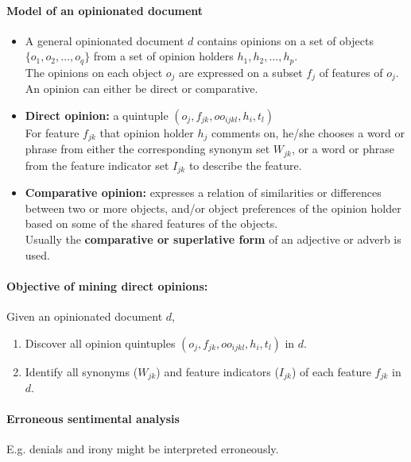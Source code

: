 \documentclass[a4paper, landscape, 6pt, fleqn]{scrartcl}
\renewcommand{\emph}[1]{\textbf{#1}}
\begin{document}
\begin{multicols*}{4}
\paragraph{Model of an opinionated document}

\begin{itemize}
\item A general opinionated document $d$ contains opinions on a set of objects $\lbrace o_1,o_2,\ldots,o_q \rbrace$ from a set of opinion holders $h_1,h_2,\ldots,h_p$. \\
The opinions on each object $o_j$ are expressed on a subset $f_j$ of features of $o_j$. \\
An opinion can either be direct or comparative.
\item \emph{Direct opinion:} a quintuple $(o_j, f_{jk}, oo_{ijkl},h_i,t_l)$ \\
For feature $f_{jk}$ that opinion holder $h_j$ comments on, he/she chooses a word or phrase from either the corresponding synonym set $W_{jk}$, or a word or phrase from the feature indicator set $I_{jk}$ to describe the feature.
\item \emph{Comparative opinion:} expresses a relation of similarities or differences between two or more objects, and/or object preferences of the opinion holder based on some of the shared features of the objects. \\
Usually the \emph{comparative or superlative form} of an adjective or adverb is used.
\end{itemize}

\paragraph{Objective of mining direct opinions:}

Given an opinionated document $d$,
\begin{enumerate}
\item Discover all opinion quintuples $(o_j, f_{jk}, oo_{ijkl},h_i,t_l)$ in $d$.
\item Identify all synonyms ($W_{jk}$) and feature indicators ($I_{jk}$) of each feature $f_{jk}$ in $d$.
\end{enumerate}

\paragraph{Erroneous sentimental analysis}

E.g. denials and irony might be interpreted erroneously.


\end{multicols*}
\end{document}
